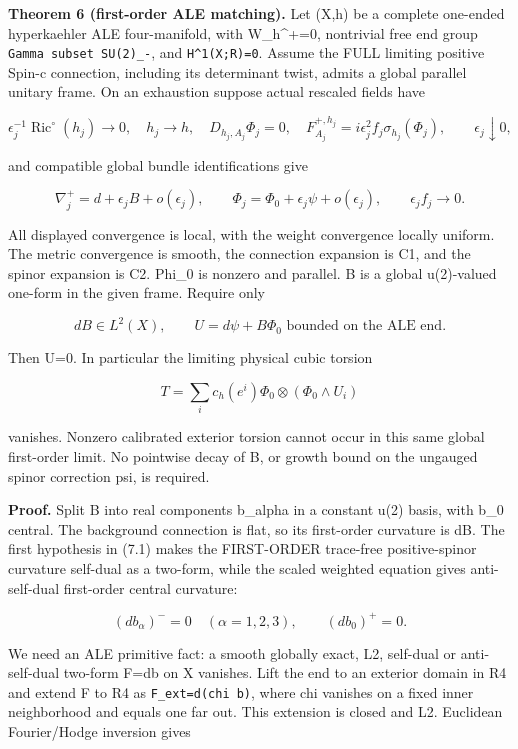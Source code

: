 \documentclass[
  10pt,
]{article}
\begin{document}
\textbf{Theorem 6 (first-order ALE matching).} Let (X,h) be a complete
one-ended hyperkaehler ALE four-manifold, with W\_h\^{}+=0, nontrivial
free end group \texttt{Gamma\ subset\ SU(2)\_-}, and
\texttt{H\^{}1(X;R)=0}. Assume the FULL limiting positive Spin-c
connection, including its determinant twist, admits a global parallel
unitary frame. On an exhaustion suppose actual rescaled fields have

\[
 \epsilon_j^{-1}\operatorname{Ric}^{\circ}(h_j)\longrightarrow0,\quad
 h_j\longrightarrow h,\quad
 D_{h_j,A_j}\Phi_j=0,\quad
 F_{A_j}^{+,h_j}=i\epsilon_j^2 f_j\sigma_{h_j}(\Phi_j),
 \qquad \epsilon_j\downarrow0,                       \tag{7.1}
\]

and compatible global bundle identifications give

\[
 \nabla_j^+=d+\epsilon_jB+o(\epsilon_j),\qquad
 \Phi_j=\Phi_0+\epsilon_j\psi+o(\epsilon_j),\qquad
 \epsilon_j f_j\longrightarrow0.                    \tag{7.2}
\]

All displayed convergence is local, with the weight convergence locally
uniform. The metric convergence is smooth, the connection expansion is
C1, and the spinor expansion is C2. Phi\_0 is nonzero and parallel. B is
a global u(2)-valued one-form in the given frame. Require only

\[
             dB\in L^2(X),\qquad
             U=d\psi+B\Phi_0\text{ bounded on the ALE end}.   \tag{7.3}
\]

Then U=0. In particular the limiting physical cubic torsion

\[
             T=\sum_i c_h(e^i)\Phi_0
                             \otimes(\Phi_0\wedge U_i)        \tag{7.4}
\]

vanishes. Nonzero calibrated exterior torsion cannot occur in this same
global first-order limit. No pointwise decay of B, or growth bound on
the ungauged spinor correction psi, is required.

\textbf{Proof.} Split B into real components b\_alpha in a constant u(2)
basis, with b\_0 central. The background connection is flat, so its
first-order curvature is dB. The first hypothesis in (7.1) makes the
FIRST-ORDER trace-free positive-spinor curvature self-dual as a
two-form, while the scaled weighted equation gives anti-self-dual
first-order central curvature:

\[
            (db_\alpha)^-=0\quad(\alpha=1,2,3),
                    \qquad(db_0)^+=0.               \tag{7.5}
\]

We need an ALE primitive fact: a smooth globally exact, L2, self-dual or
anti-self-dual two-form F=db on X vanishes. Lift the end to an exterior
domain in R4 and extend F to R4 as \texttt{F\_ext=d(chi\ b)}, where chi
vanishes on a fixed inner neighborhood and equals one far out. This
extension is closed and L2. Euclidean Fourier/Hodge inversion gives
\end{document}
